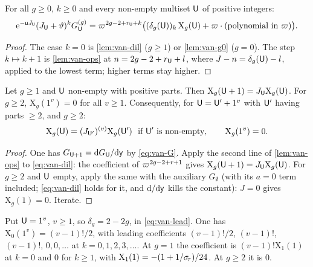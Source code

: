 \begin{lem}\label{lem:van-lead}
For all $g\geq 0$, $k\geq 0$ and every non-empty multiset $\mathsf{U}$ of positive integers:
\begin{equation}\label{eq:van-lead}
\mathrm{e}^{-\mathsf{u} J_{\mathsf{U}}}(J_{\mathsf{U}}+\vartheta)^kG^{(g)}_{\mathsf{U}}=\varpi^{2g-2+r_{\mathsf{U}}+k}\bigl((\delta_g(\mathsf{U}))_k\,\mathrm{X}_g(\mathsf{U})+\varpi\cdot(\text{polynomial in }\varpi)\bigr).
\end{equation}
\end{lem}

\begin{proof}
The case $k=0$ is \cref{lem:van-dil} ($g\geq 1$) or \cref{lem:van-g0} ($g=0$). The step $k\mapsto k+1$ is \cref{lem:van-ops} at $n=2g-2+r_{\mathsf{U}}+l$, where $J-n=\delta_g(\mathsf{U})-l$, applied to the lowest term; higher terms stay higher.
\end{proof}

\begin{cor}\label{cor:van-string}
Let $g\geq 1$ and $\mathsf{U}$ non-empty with positive parts. Then $\mathrm{X}_g(\mathsf{U}+1)=J_{\mathsf{U}}\mathrm{X}_g(\mathsf{U})$. For $g\geq 2$, $\mathrm{X}_g(1^v)=0$ for all $v\geq 1$. Consequently, for $\mathsf{U}=\mathsf{U}'+1^v$ with $\mathsf{U}'$ having parts $\geq 2$, and $g\geq 2$:
\begin{equation}\label{eq:van-string}
\mathrm{X}_g(\mathsf{U})=(J_{\mathsf{U}'})^{(v)}\mathrm{X}_g(\mathsf{U}')\ \text{ if }\mathsf{U}'\text{ is non-empty},\qquad \mathrm{X}_g(1^v)=0.
\end{equation}
\end{cor}

\begin{proof}
One has $G_{\mathsf{U}+1}=\mathrm{d} G_{\mathsf{U}}/\mathrm{d}\mathsf{y}$ by \eqref{eq:van-G}. Apply the second line of \cref{lem:van-ops} to \eqref{eq:van-dil}: the coefficient of $\varpi^{2g-2+r+1}$ gives $\mathrm{X}_g(\mathsf{U}+1)=J_{\mathsf{U}}\mathrm{X}_g(\mathsf{U})$. For $g\geq 2$ and $\mathsf{U}$ empty, apply the same with the auxiliary $G_{\emptyset}$ (with its $a=0$ term included; \eqref{eq:van-dil} holds for it, and $\mathrm{d}/\mathrm{d}\mathsf{y}$ kills the constant): $J=0$ gives $\mathrm{X}_g(1)=0$. Iterate.
\end{proof}

\begin{rmk}\label{rmk:van-table}
Put $\mathsf{U}=1^v$, $v\geq 1$, so $\delta_g=2-2g$, in \eqref{eq:van-lead}. One has $\mathrm{X}_0(1^v)=(v-1)!/2$, with leading coefficients $(v-1)!/2$, $(v-1)!$, $(v-1)!$, $0,0,\dots$ at $k=0,1,2,3,\dots$. At $g=1$ the coefficient is $(v-1)!\mathrm{X}_1(1)$ at $k=0$ and $0$ for $k\geq 1$, with $\mathrm{X}_1(1)=-(1+1/\sigma_{\!\tau})/24$. At $g\geq 2$ it is $0$.
\end{rmk}

